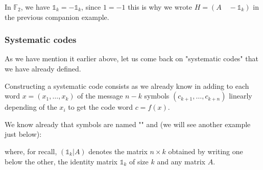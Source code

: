 	\begin{tcolorbox}[title=Remark,colframe=black,arc=10pt]
	In $\mathbb{F}_2$, we have $\mathds{1}_k=-\mathds{1}_k$, since $1=-1$ this is why we wrote $H=(A\quad -\mathds{1}_k)$ in the previous companion example.
	\end{tcolorbox}
	
	\subsubsection{Systematic codes}
	As we have mention it earlier above, let us come back on "systematic codes" that we have already defined.
	
	Constructing a systematic code consists as we already know in adding to each word $x=(x_1,\ldots,x_k)$ of the message $n-k$ symbols $(c_{k+1},\ldots,c_{k+n})$ linearly depending of the $x_i$ to get the code word $c=f(x)$.

	We know already that symbols are named "" and (we will see another example just below):
	
	where, for recall, $(\mathds{1}_k|A)$ denotes the matrix $n\times k$ obtained by writing one below the other, the identity matrix $\mathds{1}_k$ of size $k$ and any matrix $A$.
	
